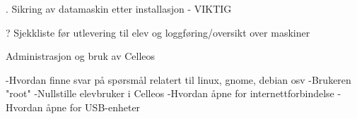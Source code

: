 . Sikring av datamaskin etter installasjon - VIKTIG

\beginsection ? Sjekkliste f\o r utlevering til elev og loggf\o ring/oversikt over maskiner

\beginsection Administrasjon og bruk av Celleos

-Hvordan finne svar p\aa{} sp\o rsm\aa l relatert til linux, gnome, debian osv
-Brukeren "root"
-Nullstille elevbruker i Celleos
-Hvordan \aa pne for internettforbindelse
-Hvordan \aa pne for USB-enheter

\vfill\eject\bye

